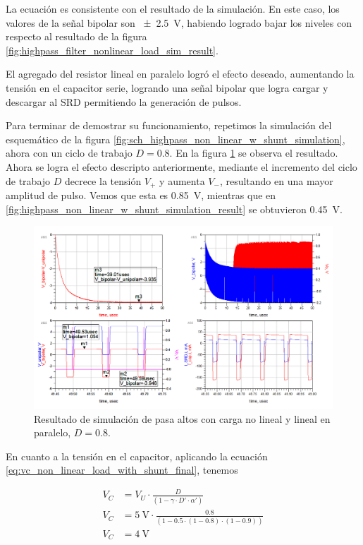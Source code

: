 La ecuación es consistente con el resultado de la simulación. En este caso, los
valores de la señal bipolar son \qty{\pm2.5}{\volt}, habiendo logrado bajar los
niveles con respecto al resultado de la figura
\ref{fig:highpass_filter_nonlinear_load_sim_result}.

El agregado del resistor lineal en paralelo logró el efecto deseado, aumentando
la tensión en el capacitor serie, logrando una señal bipolar que logra cargar y
descargar al SRD permitiendo la generación de pulsos.

Para terminar de demostrar su funcionamiento, repetimos la simulación del
esquemático de la figura \ref{fig:sch_highpass_non_linear_w_shunt_simulation},
ahora con un ciclo de trabajo $D=0.8$. En la figura
\ref{fig:highpass_non_linear_w_shunt_simulation_result_80_dc} se observa el
resultado. Ahora se logra el efecto descripto anteriormente, mediante el
incremento del ciclo de trabajo $D$ decrece la tensión $V_{+}$ y aumenta
$V_{-}$, resultando en una mayor amplitud de pulso. Vemos que esta es
\qty{0.85}{\volt}, mientras que en
\ref{fig:highpass_non_linear_w_shunt_simulation_result} se obtuvieron
\qty{0.45}{\volt}.

\begin{figure}[tbp]
    \centering
    \includegraphics[width=\textwidth]{images/highpass_nonlinear_w_shunt_sim_result_80_dc.png}
    \caption{Resultado de simulación de pasa altos con carga no lineal y lineal
    en paralelo, $D=0.8$.}
    \label{fig:highpass_non_linear_w_shunt_simulation_result_80_dc}
\end{figure}

En cuanto a la tensión en el capacitor, aplicando la ecuación
\ref{eq:vc_non_linear_load_with_shunt_final}, tenemos

\begin{equation}
    \begin{aligned}
        V_C &= V_U \cdot \frac{D}{\left( 1 - \gamma \cdot D' \cdot \alpha'\right)} \\
        V_C &= \qty{5}{\volt} \cdot \frac{0.8}{\left( 1 - 0.5 \cdot (1-0.8)
        \cdot (1-0.9) \right)} \\
        V_C &= \qty{4}{\volt} \\
    \end{aligned}
\end{equation}

